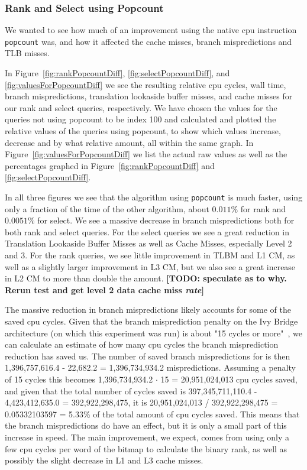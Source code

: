 \subsubsection{Rank and Select using Popcount}
\label{sec:experimentPopcountRankSelect}
We wanted to see how much of an improvement using the native cpu instruction \texttt{popcount} was, and how it affected the cache misses, branch mispredictions and TLB misses.



In Figure~\ref{fig:rankPopcountDiff}, \ref{fig:selectPopcountDiff}, and \ref{fig:valuesForPopcountDiff} we see the resulting relative cpu cycles, wall time, branch mispredictions, translation lookaside buffer misses, and cache misses for our rank and select queries, respectively.
We have chosen the values for the queries not using popcount to be index 100 and calculated and plotted the relative values of the queries using popcount, to show which values increase, decrease and by what relative amount, all within the same graph.
In Figure~\ref{fig:valuesForPopcountDiff} we list the actual raw values as well as the percentages graphed in Figure~\ref{fig:rankPopcountDiff} and \ref{fig:selectPopcountDiff}.

In all three figures we see that the algorithm using \texttt{popcount} is much faster, using only a fraction of the time of the other algorithm, about $0.011\%$ for rank and $0.0051\%$ for select.
We see a massive decrease in branch mispredictions both for both rank and select queries. For the select queries we see a great reduction in Translation Lookaside Buffer Misses as well as Cache Misses, especially Level 2 and 3.
For the rank queries, we see little improvement in TLBM and L1 CM, as well as a slightly larger improvement in L3 CM, but we also see a great increase in L2 CM to more than double the amount.
\textbf{[TODO: speculate as to why. Rerun test and get level 2 data cache miss \textit{rate}]}


The massive reduction in branch mispredictions likely accounts for some of the saved cpu cycles.
Given that the branch misprediction penalty on the Ivy Bridge architecture (on which this experiment was run) is about "15 cycles or more"~\cite{agner}, we can calculate an estimate of how many cpu cycles the branch misprediction reduction has saved us.
The number of saved branch mispredictions for  is then 1,396,757,616.4 - 22,682.2 = 1,396,734,934.2 mispredictions. Assuming a penalty of 15 cycles this becomes 1,396,734,934.2 $\cdot$ 15 = 20,951,024,013 cpu cycles saved, and given that the total number of cycles saved is 397,345,711,110.4 - 4,423,412,635.0 = 392,922,298,475, it is 20,951,024,013 / 392,922,298,475 = 0.05332103597 = 5.33\% of the total amount of cpu cycles saved.
This means that the branch mispredictions do have an effect, but it is only a small part of this increase in speed. The main improvement, we expect, comes from using only a few cpu cycles per word of the bitmap to calculate the binary rank, as well as possibly the slight decrease in L1 and L3 cache misses.


